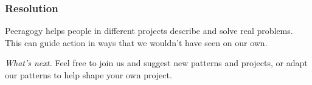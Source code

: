 \subsubsection*{Resolution}
Peeragogy helps people in different projects describe and solve real problems.  This can guide action in ways that we wouldn't have seen on our own.

\begin{framed}
\noindent \emph{What's next.}  Feel free to join us and suggest new patterns and
projects, or adapt our patterns to help shape your own
 project.
\end{framed}


\endgroup
